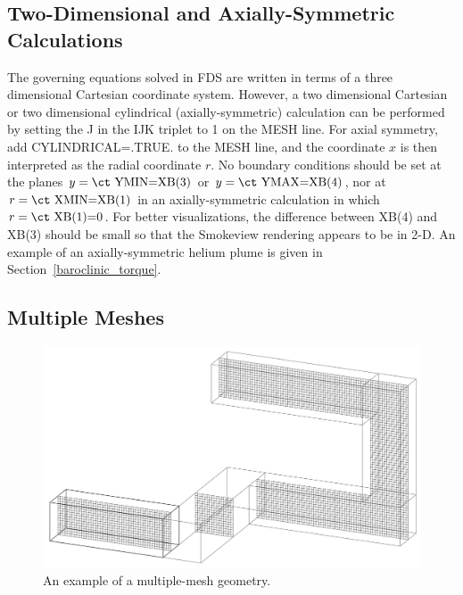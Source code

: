 \documentclass[11pt]{book}
\begin{document}
\subsection{Two-Dimensional and Axially-Symmetric Calculations}
\label{info:2D}

The governing equations solved in FDS are written in terms of a
three dimensional Cartesian coordinate system. However,
a two dimensional Cartesian or two dimensional cylindrical
(axially-symmetric) calculation can be performed by setting the {\ct J} in the {\ct IJK} triplet
to 1 on the {\ct MESH} line. For axial symmetry, add {\ct CYLINDRICAL=.TRUE.} to the
{\ct MESH} line, and the coordinate $x$ is then interpreted as the radial coordinate $r$.
No boundary conditions should be set at the planes $y=\hbox{\ct YMIN=XB(3)}$ or
$y=\hbox{\ct YMAX=XB(4)}$, nor at $r=\hbox{\ct XMIN=XB(1)}$ in an axially-symmetric
calculation in which $r=\hbox{\ct XB(1)=0}$. For better visualizations, the difference between
{\ct XB(4)} and {\ct XB(3)} should be small so that the Smokeview rendering appears to be in 2-D.
An example of an axially-symmetric helium plume is given in Section~\ref{baroclinic_torque}.


\subsection{Multiple Meshes}
\label{info:multimesh}

\begin{figure}[ht!]
\includegraphics[width=\textwidth]{FIGURES/hallways}
\caption{An example of a multiple-mesh geometry.}
\label{fig:domain}
\end{figure}
\end{document}
